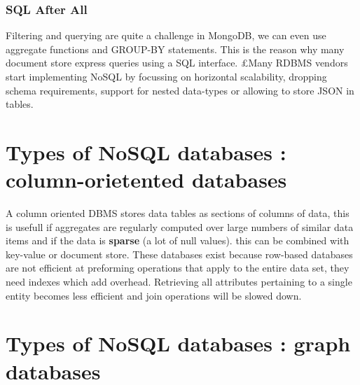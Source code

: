\documentclass{report}
\begin{document}
			\subsection{SQL After All}
				Filtering and querying are quite a challenge in MongoDB, we can even use aggregate functions and GROUP-BY statements. This is the reason why many document store express queries using a SQL interface. £Many RDBMS vendors start implementing NoSQL by focussing on horizontal scalability, dropping schema requirements, support for nested data-types or allowing to store JSON in tables.
	\chapter{Types of NoSQL databases : column-orietented databases}
		A column oriented DBMS stores data tables as sections of columns of data, this is usefull if aggregates are regularly computed over large numbers of similar data items and if the data is \textbf{sparse} (a lot of null values). this can be combined with key-value or document store.
		These databases exist because row-based databases are not efficient at preforming operations that apply to the entire data set, they need indexes which add overhead. Retrieving all attributes pertaining to a single entity becomes less efficient and join operations will be slowed down.
	\chapter{Types of NoSQL databases : graph databases}
		
		
\end{document}

